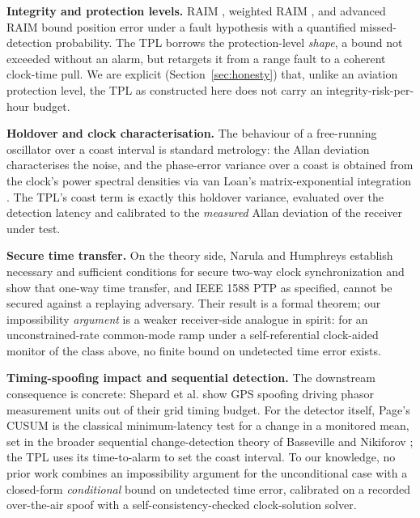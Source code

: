 \documentclass[conference]{IEEEtran}
\begin{document}
\textbf{Integrity and protection levels.} RAIM \cite{brown}, weighted RAIM
\cite{walter}, and advanced RAIM \cite{blanch} bound position error under a fault
hypothesis with a quantified missed-detection probability. The TPL borrows the
protection-level \emph{shape}, a bound not exceeded without an alarm, but retargets
it from a range fault to a coherent clock-time pull. We are explicit
(Section~\ref{sec:honesty}) that, unlike an aviation protection level, the TPL as
constructed here does not carry an integrity-risk-per-hour budget.

\textbf{Holdover and clock characterisation.} The behaviour of a free-running
oscillator over a coast interval is standard metrology: the Allan deviation
\cite{allan,riley} characterises the noise, and the phase-error variance over a
coast is obtained from the clock's power spectral densities via van Loan's
matrix-exponential integration \cite{vanloan}. The TPL's coast term is exactly this
holdover variance, evaluated over the detection latency and calibrated to the
\emph{measured} Allan deviation of the receiver under test.

\textbf{Secure time transfer.} On the theory side, Narula and Humphreys
\cite{narula} establish necessary and sufficient conditions for secure two-way
clock synchronization and show that one-way time transfer, and IEEE 1588 PTP
\cite{ptp} as specified, cannot be secured against a replaying adversary. Their
result is a formal theorem; our impossibility \emph{argument} is a weaker
receiver-side analogue in spirit: for an unconstrained-rate common-mode ramp under a
self-referential clock-aided monitor of the class above, no finite bound on
undetected time error exists.

\textbf{Timing-spoofing impact and sequential detection.} The downstream
consequence is concrete: Shepard et al. \cite{shepard} show GPS spoofing driving
phasor measurement units out of their grid timing budget. For the detector itself,
Page's CUSUM \cite{page} is the classical minimum-latency test for a change in a
monitored mean, set in the broader sequential change-detection theory of Basseville
and Nikiforov \cite{basseville}; the TPL uses its time-to-alarm to set the coast
interval. To our knowledge, no prior work combines an impossibility argument for
the unconditional case with a closed-form \emph{conditional} bound on undetected
time error, calibrated on a recorded over-the-air spoof with a self-consistency-checked
clock-solution solver.
\end{document}
